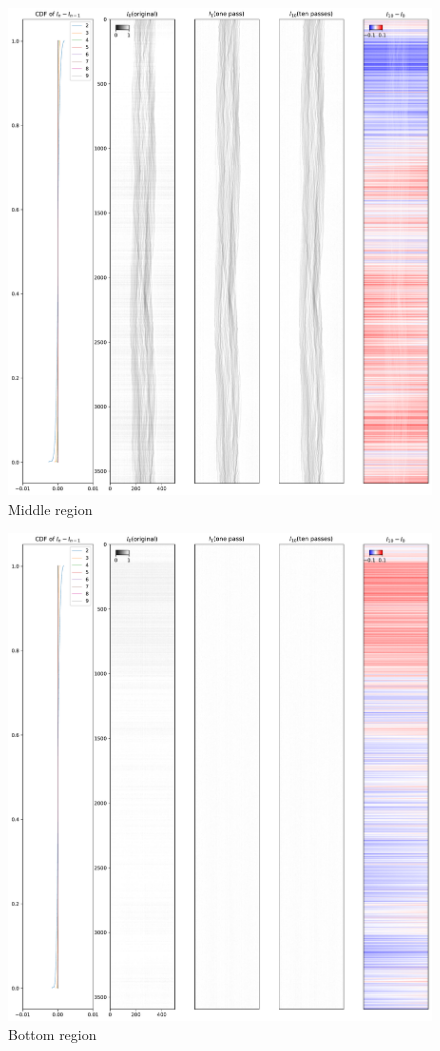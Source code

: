 \documentclass[12pt]{scrartcl}
\newcommand{\myscale}{1}
\begin{document}
\begin{figure}
\centering
\includegraphics[scale=\myscale]{sinogramNormalization_middle}
\caption{
Middle region
}\label{fig: sino norm mid}
\end{figure}

\begin{figure}
\centering
\includegraphics[scale=\myscale]{sinogramNormalization_bottom}
\caption{
Bottom region
}\label{fig: sino norm bot}
\end{figure}
\end{document}
